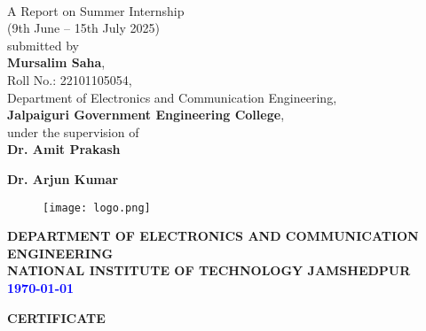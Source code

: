 \documentclass[12pt]{article}
\begin{document}
\thispagestyle{empty}
\begin{center}
\\
\end{center}
\vspace{10mm}
\begin{center}
A Report on Summer Internship\\ (9th June – 15th July 2025)\\ 
submitted by \\
\vspace{3mm}
\textbf{Mursalim Saha},
\\ 
Roll No.: 22101105054,\\
Department of Electronics and Communication Engineering,\\
\textbf{Jalpaiguri Government Engineering College},
\\ \vspace{3mm}
under the supervision of \\
\vspace{5mm}
\textbf{Dr. Amit Prakash}

\textbf{Dr. Arjun Kumar}

\vspace{5mm}
\end{center}
\begin{figure}[h!]
    \centering
    \texttt{[image: logo.png]}
   
\end{figure}
\begin{center}
\vspace{2mm}
{\bf {\large {\sc \textbf{DEPARTMENT OF ELECTRONICS AND COMMUNICATION ENGINEERING}}}}\\
\vspace{2mm}
{\bf {\large {\sc \textbf{NATIONAL INSTITUTE OF TECHNOLOGY JAMSHEDPUR}}}}\\
\vspace{2mm}
{\textbf{ \textcolor{blue}{\today}}}\\
\end{center}
\newpage
\begin{center}
\begin{large}
{\bf CERTIFICATE}
\end{large}
\end{center}
\vskip 0.2in
\end{document}
